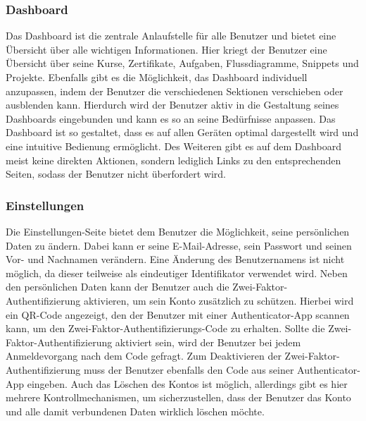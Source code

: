 \documentclass[main.tex]{subfiles}
\begin{document}
    \subsubsection{Dashboard}
    Das Dashboard ist die zentrale Anlaufstelle für alle Benutzer und bietet eine Übersicht über alle wichtigen Informationen.
    Hier kriegt der Benutzer eine Übersicht über seine Kurse, Zertifikate, Aufgaben, Flussdiagramme, Snippets und Projekte.
    Ebenfalls gibt es die Möglichkeit, das Dashboard individuell anzupassen, indem der Benutzer die verschiedenen Sektionen verschieben oder ausblenden kann.
    Hierdurch wird der Benutzer aktiv in die Gestaltung seines Dashboards eingebunden und kann es so an seine Bedürfnisse anpassen.
    Das Dashboard ist so gestaltet, dass es auf allen Geräten optimal dargestellt wird und eine intuitive Bedienung ermöglicht.
    Des Weiteren gibt es auf dem Dashboard meist keine direkten Aktionen, sondern lediglich Links zu den entsprechenden Seiten, sodass der Benutzer nicht überfordert wird.
    \subsubsection{Einstellungen}
    Die Einstellungen-Seite bietet dem Benutzer die Möglichkeit, seine persönlichen Daten zu ändern.
    Dabei kann er seine E-Mail-Adresse, sein Passwort und seinen Vor- und Nachnamen verändern.
    Eine Änderung des Benutzernamens ist nicht möglich, da dieser teilweise als eindeutiger Identifikator verwendet wird.
    Neben den persönlichen Daten kann der Benutzer auch die Zwei-Faktor-Authentifizierung aktivieren, um sein Konto zusätzlich zu schützen.
    Hierbei wird ein QR-Code angezeigt, den der Benutzer mit einer Authenticator-App scannen kann, um den Zwei-Faktor-Authentifizierungs-Code zu erhalten.
    Sollte die Zwei-Faktor-Authentifizierung aktiviert sein, wird der Benutzer bei jedem Anmeldevorgang nach dem Code gefragt.
    Zum Deaktivieren der Zwei-Faktor-Authentifizierung muss der Benutzer ebenfalls den Code aus seiner Authenticator-App eingeben.
    Auch das Löschen des Kontos ist möglich, allerdings gibt es hier mehrere Kontrollmechanismen, um sicherzustellen, dass der Benutzer das Konto und alle damit verbundenen Daten wirklich löschen möchte.
\end{document}
